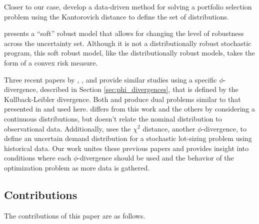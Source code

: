 \documentclass[opre,nonblindrev]{informs3} %
\begin{document}
Closer to our case, \citet{pflug2007ambiguity} develop a data-driven method for solving a portfolio selection problem using the Kantorovich distance to define the set of distributions.

\citet{bental2010soft} presents a ``soft'' robust model that allows for changing the level of robustness across the uncertainty set.
Although it is not a distributionally robust stochastic program, this soft robust model, like the distributionally robust models, takes the form of a convex risk measure.

Three recent papers by \citet{wang2010likelihood}, \citet{calafiore2007ambiguous}, and \citet{hukullback} provide similar studies using a specific $\phi$-divergence, described in Section \ref{sec:phi_divergences}, that is defined by the Kullback-Leibler divergence.
Both \citep{wang2010likelihood} and \citep{hukullback} produce dual problems similar to that presented in \citep{bental2013robust} and used here.
\citet{hukullback} differs from this work and the others by considering a continuous distributions, but doesn't relate the nominal distribution to observational data.
Additionally, \citet{klabjan2013robust} uses the $\chi^2$ distance, another $\phi$-divergence, to define an uncertain demand distribution for a stochastic lot-sizing problem using historical data.
Our work unites these previous papers and provides insight into conditions where each $\phi$-divergence should be used and the behavior of the optimization problem as more data is gathered.

\subsection{Contributions}

The contributions of this paper are as follows. 
\end{document}
